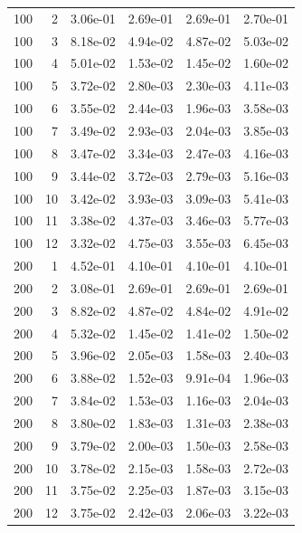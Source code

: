 \begin{longtable}{r r S[table-format=1.2e-2] S[table-format=1.2e-2] S[table-format=1.2e-2] S[table-format=1.2e-2]}
100 & 2 & 3.06e-01 & 2.69e-01 & 2.69e-01 & 2.70e-01 \\
100 & 3 & 8.18e-02 & 4.94e-02 & 4.87e-02 & 5.03e-02 \\
100 & 4 & 5.01e-02 & 1.53e-02 & 1.45e-02 & 1.60e-02 \\
100 & 5 & 3.72e-02 & 2.80e-03 & 2.30e-03 & 4.11e-03 \\
100 & 6 & 3.55e-02 & 2.44e-03 & 1.96e-03 & 3.58e-03 \\
100 & 7 & 3.49e-02 & 2.93e-03 & 2.04e-03 & 3.85e-03 \\
100 & 8 & 3.47e-02 & 3.34e-03 & 2.47e-03 & 4.16e-03 \\
100 & 9 & 3.44e-02 & 3.72e-03 & 2.79e-03 & 5.16e-03 \\
100 & 10 & 3.42e-02 & 3.93e-03 & 3.09e-03 & 5.41e-03 \\
100 & 11 & 3.38e-02 & 4.37e-03 & 3.46e-03 & 5.77e-03 \\
100 & 12 & 3.32e-02 & 4.75e-03 & 3.55e-03 & 6.45e-03 \\
200 & 1 & 4.52e-01 & 4.10e-01 & 4.10e-01 & 4.10e-01 \\
200 & 2 & 3.08e-01 & 2.69e-01 & 2.69e-01 & 2.69e-01 \\
200 & 3 & 8.82e-02 & 4.87e-02 & 4.84e-02 & 4.91e-02 \\
200 & 4 & 5.32e-02 & 1.45e-02 & 1.41e-02 & 1.50e-02 \\
200 & 5 & 3.96e-02 & 2.05e-03 & 1.58e-03 & 2.40e-03 \\
200 & 6 & 3.88e-02 & 1.52e-03 & 9.91e-04 & 1.96e-03 \\
200 & 7 & 3.84e-02 & 1.53e-03 & 1.16e-03 & 2.04e-03 \\
200 & 8 & 3.80e-02 & 1.83e-03 & 1.31e-03 & 2.38e-03 \\
200 & 9 & 3.79e-02 & 2.00e-03 & 1.50e-03 & 2.58e-03 \\
200 & 10 & 3.78e-02 & 2.15e-03 & 1.58e-03 & 2.72e-03 \\
200 & 11 & 3.75e-02 & 2.25e-03 & 1.87e-03 & 3.15e-03 \\
200 & 12 & 3.75e-02 & 2.42e-03 & 2.06e-03 & 3.22e-03 \\
\end{longtable}
